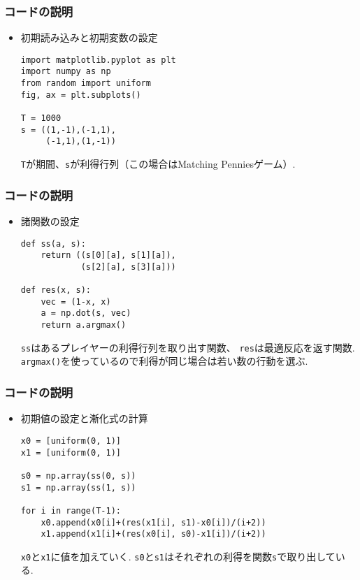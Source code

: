 \documentclass[dvipdfmx,fleqn]{beamer}
\begin{document}
\begin{frame}[containsverbatim]%
\frametitle{コードの説明}
\begin{itemize}\setlength{\parskip}{0.5em}

\item
初期読み込みと初期変数の設定

\begin{verbatim}
import matplotlib.pyplot as plt
import numpy as np
from random import uniform
fig, ax = plt.subplots()

T = 1000
s = ((1,-1),(-1,1),
     (-1,1),(1,-1))
\end{verbatim}

\verb|T|が期間、\verb|s|が利得行列（この場合はMatching Penniesゲーム）.

\end{itemize}
\end{frame}

\begin{frame}[containsverbatim]%
\frametitle{コードの説明}
\begin{itemize}\setlength{\parskip}{0.5em}

\item
諸関数の設定

\begin{verbatim}
def ss(a, s):
    return ((s[0][a], s[1][a]),
            (s[2][a], s[3][a]))

def res(x, s):
    vec = (1-x, x)
    a = np.dot(s, vec) 
    return a.argmax()

\end{verbatim}

\verb|ss|はあるプレイヤーの利得行列を取り出す関数、
\verb|res|は最適反応を返す関数.
\verb|argmax()|を使っているので利得が同じ場合は若い数の行動を選ぶ.

\end{itemize}
\end{frame}


\begin{frame}[containsverbatim]%
\frametitle{コードの説明}
\begin{itemize}\setlength{\parskip}{0.5em}

\item
初期値の設定と漸化式の計算

\begin{verbatim}
x0 = [uniform(0, 1)]
x1 = [uniform(0, 1)]

s0 = np.array(ss(0, s))
s1 = np.array(ss(1, s))

for i in range(T-1):
    x0.append(x0[i]+(res(x1[i], s1)-x0[i])/(i+2))
    x1.append(x1[i]+(res(x0[i], s0)-x1[i])/(i+2))

\end{verbatim}

\verb|x0|と\verb|x1|に値を加えていく.
\verb|s0|と\verb|s1|はそれぞれの利得を関数\verb|s|で取り出している.

\end{itemize}
\end{frame}
\end{document}
